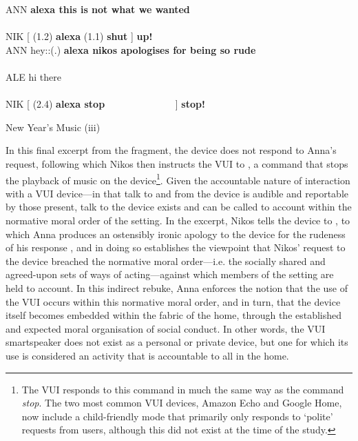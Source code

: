 \begin{inlinefrag}
    {
    \begin{transcript}[12]
        \by ANN {\textbf{alexa this is not what we wanted}} \\
        \by     {[ ((laughs))~~~~~~~~~~~~~]} \\
        \by NIK {[ (1.2) \textbf{alexa} (1.1) \textbf{shut} ] \textbf{up!}} \\
        \by ANN {hey::\intUp (.) \textbf{alexa nikos apologises for being so rude}} \\
         \\
        \by ALE {hi there} \\
         \\
        \by NIK {[ (2.4) \textbf{alexa stop} ~~~~~~~~~~~~~~] \textbf{stop!}} \\
    \end{transcript}
    \caption{New Year's Music (iii)}\label{frag:empirical home findings music-iii}
    }
\end{inlinefrag}

\begin{revisedsubmission}
In this final excerpt from the fragment, the device does not respond to Anna's request, following which Nikos then instructs the \ac{VUI} to , a command that stops the playback of music on the device\footnote{The \ac{VUI} responds to this command in much the same way as the command \textit{stop}. The two most common \ac{VUI} devices, Amazon Echo and Google Home, now include a child-friendly mode that primarily only responds to `polite' requests from users, although this did not exist at the time of the study.}.
Given the accountable nature of interaction with a \ac{VUI} device---in that talk to and from the device is audible and reportable by those present, talk to the device exists and can be called to account within the normative moral order of the setting.
In the excerpt, Nikos tells the device to , to which Anna produces an ostensibly ironic apology to the device for the rudeness of his response , and in doing so establishes the viewpoint that Nikos' request to the device breached the normative moral order---i.e. the socially shared and agreed-upon sets of ways of acting---against which members of the setting are held to account.
In this indirect rebuke, Anna enforces the notion that the use of the \ac{VUI} occurs within this normative moral order, and in turn, that the device itself becomes embedded within the fabric of the home, through the established and expected moral organisation of social conduct.
In other words, the \ac{VUI} smartspeaker does not exist as a personal or private device, but one for which its use is considered an activity that is accountable to all in the home.
\end{revisedsubmission}



